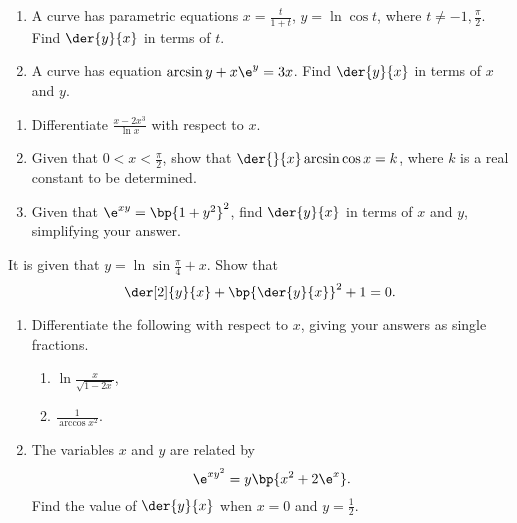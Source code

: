\begin{problem}
    \begin{enumerate}
        \item A curve has parametric equations $x = \frac{t}{1 + t}$, $y = \ln \cos t$, where $t \neq -1, \frac\pi2$. Find $\der{y}{x}$ in terms of $t$.
        \item A curve has equation $\arcsin y + x\e^y = 3x$. Find $\der{y}{x}$ in terms of $x$ and $y$.
    \end{enumerate}
\end{problem}

\begin{problem}
    \begin{enumerate}
        \item Differentiate $\frac{x - 2x^3}{\ln x}$ with respect to $x$.
        \item Given that $0 < x < \frac\pi2$, show that $\der{}{x} \arcsin{\cos x} = k$, where $k$ is a real constant to be determined.
        \item Given that $\e^{xy} = \bp{1 + y^2}^2$, find $\der{y}{x}$ in terms of $x$ and $y$, simplifying your answer.
    \end{enumerate}
\end{problem}

\begin{problem}
    It is given that $y = \ln \sin{\frac\pi4 + x}$. Show that \[\der[2]{y}{x} + \bp{\der{y}{x}}^2 + 1 = 0.\]
\end{problem}

\begin{problem}
    \begin{enumerate}
        \item Differentiate the following with respect to $x$, giving your answers as single fractions.
        \begin{enumerate}
            \item $\ln \frac{x}{\sqrt{1 - 2x}}$,
            \item $\frac1{\arccos{x^2}}$.
        \end{enumerate}
        \item The variables $x$ and $y$ are related by \[\e^{xy^2} = y \bp{x^2 + 2\e^x}.\] Find the value of $\der{y}{x}$ when $x = 0$ and $y = \frac12$.
    \end{enumerate}
\end{problem}